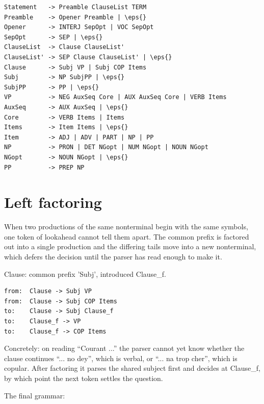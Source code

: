 \documentclass[11pt,a4paper]{article}
\newcommand{\vbfmt}{\color{ink!88}}
\newcommand{\eps}{\ensuremath{\varepsilon}}
\begin{document}
\begin{Verbatim}[commandchars=\\\{\},fontsize=\small,formatcom=\vbfmt,frame=leftline,framerule=1.2pt,rulecolor=\color{clay!55},framesep=6pt,xleftmargin=10pt,xrightmargin=4pt]
Statement   -> Preamble ClauseList TERM
Preamble    -> Opener Preamble | \eps{}
Opener      -> INTERJ SepOpt | VOC SepOpt
SepOpt      -> SEP | \eps{}
ClauseList  -> Clause ClauseList'
ClauseList' -> SEP Clause ClauseList' | \eps{}
Clause      -> Subj VP | Subj COP Items
Subj        -> NP SubjPP | \eps{}
SubjPP      -> PP | \eps{}
VP          -> NEG AuxSeq Core | AUX AuxSeq Core | VERB Items
AuxSeq      -> AUX AuxSeq | \eps{}
Core        -> VERB Items | Items
Items       -> Item Items | \eps{}
Item        -> ADJ | ADV | PART | NP | PP
NP          -> PRON | DET NGopt | NUM NGopt | NOUN NGopt
NGopt       -> NOUN NGopt | \eps{}
PP          -> PREP NP
\end{Verbatim}
\section{Left factoring}
\label{sec:left-factoring}
When two productions of the same nonterminal begin with the same symbols, one token of lookahead cannot tell them apart. The common prefix is factored out into a single production and the differing tails move into a new nonterminal, which defers the decision until the parser has read enough to make it.

Clause: common prefix 'Subj', introduced Clause\_f.

\begin{Verbatim}[commandchars=\\\{\},fontsize=\small,formatcom=\vbfmt,frame=leftline,framerule=1.2pt,rulecolor=\color{clay!55},framesep=6pt,xleftmargin=10pt,xrightmargin=4pt]
from:  Clause -> Subj VP
from:  Clause -> Subj COP Items
to:    Clause -> Subj Clause_f
to:    Clause_f -> VP
to:    Clause_f -> COP Items
\end{Verbatim}
Concretely: on reading ``Courant ...'' the parser cannot yet know whether the clause continues ``... no dey'', which is verbal, or ``... na trop cher'', which is copular. After factoring it parses the shared subject first and decides at Clause\_f, by which point the next token settles the question.

The final grammar:
\end{document}
